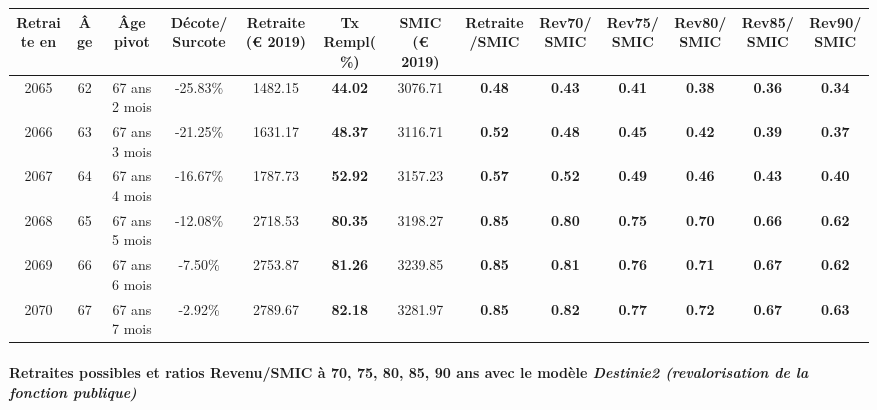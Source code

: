 { \scriptsize \begin{center} 
\begin{tabular}[htb]{|c|c||c|c||c|c||c||c|c|c|c|c|c|} 
\hline 
 Retraite en &  Âge &  Âge pivot &  Décote/Surcote &  Retraite (\euro{} 2019) &  Tx Rempl(\%) &  SMIC (\euro{} 2019) &  Retraite/SMIC &  Rev70/SMIC &  Rev75/SMIC &  Rev80/SMIC &  Rev85/SMIC &  Rev90/SMIC \\ 
\hline \hline 
 2065 &  62 &  67 ans 2 mois &  -25.83\% &  1482.15 &  {\bf 44.02} &  3076.71 &  {\bf {\color{red} 0.48}} &  {\bf {\color{red} 0.43}} &  {\bf {\color{red} 0.41}} &  {\bf {\color{red} 0.38}} &  {\bf {\color{red} 0.36}} &  {\bf {\color{red} 0.34}} \\ 
\hline 
 2066 &  63 &  67 ans 3 mois &  -21.25\% &  1631.17 &  {\bf 48.37} &  3116.71 &  {\bf {\color{red} 0.52}} &  {\bf {\color{red} 0.48}} &  {\bf {\color{red} 0.45}} &  {\bf {\color{red} 0.42}} &  {\bf {\color{red} 0.39}} &  {\bf {\color{red} 0.37}} \\ 
\hline 
 2067 &  64 &  67 ans 4 mois &  -16.67\% &  1787.73 &  {\bf 52.92} &  3157.23 &  {\bf {\color{red} 0.57}} &  {\bf {\color{red} 0.52}} &  {\bf {\color{red} 0.49}} &  {\bf {\color{red} 0.46}} &  {\bf {\color{red} 0.43}} &  {\bf {\color{red} 0.40}} \\ 
\hline 
 2068 &  65 &  67 ans 5 mois &  -12.08\% &  2718.53 &  {\bf 80.35} &  3198.27 &  {\bf {\color{red} 0.85}} &  {\bf {\color{red} 0.80}} &  {\bf {\color{red} 0.75}} &  {\bf {\color{red} 0.70}} &  {\bf {\color{red} 0.66}} &  {\bf {\color{red} 0.62}} \\ 
\hline 
 2069 &  66 &  67 ans 6 mois &  -7.50\% &  2753.87 &  {\bf 81.26} &  3239.85 &  {\bf {\color{red} 0.85}} &  {\bf {\color{red} 0.81}} &  {\bf {\color{red} 0.76}} &  {\bf {\color{red} 0.71}} &  {\bf {\color{red} 0.67}} &  {\bf {\color{red} 0.62}} \\ 
\hline 
 2070 &  67 &  67 ans 7 mois &  -2.92\% &  2789.67 &  {\bf 82.18} &  3281.97 &  {\bf {\color{red} 0.85}} &  {\bf {\color{red} 0.82}} &  {\bf {\color{red} 0.77}} &  {\bf {\color{red} 0.72}} &  {\bf {\color{red} 0.67}} &  {\bf {\color{red} 0.63}} \\ 
\hline 
\hline 
\end{tabular} 
\end{center} } 
\paragraph{Retraites possibles et ratios Revenu/SMIC à 70, 75, 80, 85, 90 ans avec le modèle \emph{Destinie2 (revalorisation de la fonction publique)}}  
 
